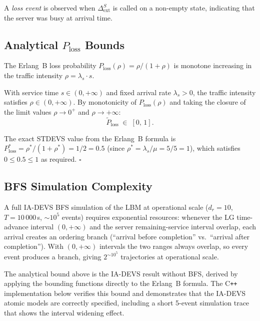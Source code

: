 A \emph{loss event} is observed when $\Delta^S_{\mathrm{ext}}$ is called
on a non-empty state, indicating that the server was busy at arrival time.

\subsection*{Analytical $P_{\mathrm{loss}}$ Bounds}

The Erlang~B loss probability $P_{\mathrm{loss}}(\rho) = \rho/(1+\rho)$
is monotone increasing in the traffic intensity $\rho = \lambda_s \cdot s$.

With service time $s \in (0,+\infty)$ and fixed arrival rate $\lambda_s > 0$,
the traffic intensity satisfies $\rho \in (0,+\infty)$.  By monotonicity of
$P_{\mathrm{loss}}(\rho)$ and taking the closure of the limit values
$\rho \to 0^+$ and $\rho \to +\infty$:
\[
  \tilde P_{\mathrm{loss}} \;\in\; [0,\, 1].
\]

The exact STDEVS value from the Erlang~B formula is
$P_{\mathrm{loss}}^* = \rho^*/(1+\rho^*) = 1/2 = 0.5$
(since $\rho^* = \lambda_s/\mu = 5/5 = 1$),
which satisfies $0 \leq 0.5 \leq 1$ as required. \hfill$\square$

\subsection*{BFS Simulation Complexity}

A full IA-DEVS BFS simulation of the LBM at operational scale
($d_r = 10$, $T = 10\,000$\,s, ${\sim}10^5$ events) requires exponential
resources: whenever the LG time-advance interval $(0,+\infty)$ and the
server remaining-service interval overlap, each arrival creates an ordering
branch (``arrival before completion'' vs.\ ``arrival after completion'').
With $(0,+\infty)$ intervals the two ranges always overlap, so every event
produces a branch, giving $2^{{\sim}10^5}$ trajectories at operational scale.

The analytical bound above is the IA-DEVS result without BFS, derived by
applying the bounding functions directly to the Erlang~B formula.  The
C\texttt{++} implementation below verifies this bound and demonstrates that
the IA-DEVS atomic models are correctly specified, including a short
5-event simulation trace that shows the interval widening effect.

